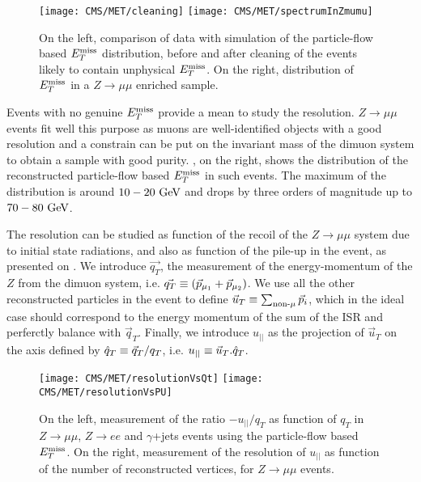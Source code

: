         \begin{figure}[h!]
            \centering
            \texttt{[image: CMS/MET/cleaning]}
            \texttt{[image: CMS/MET/spectrumInZmumu]}
            \caption{On the left, comparison \cite{METperf} of data with simulation of the
            particle-flow based $E_T^\text{miss}$ distribution, before and after cleaning of the events
            likely to contain unphysical $E_T^\text{miss}$. On the right, distribution of $E_T^\text{miss}$ in
            a $Z \rightarrow \mu\mu$ enriched sample. }
            \label{fig:METspectrum}
        \end{figure}

        Events with no genuine $E_T^\text{miss}$ provide a mean to study the resolution.
        $Z \rightarrow \mu\mu$ events fit well this purpose as muons are well-identified objects
        with a good resolution and a constrain can be put on the invariant mass of the
        dimuon system to obtain a sample with good purity. ,
        on the right, shows the distribution of the reconstructed particle-flow based
        $E_T^\text{miss}$ in such events. The maximum of the distribution is around $10-20~\text{GeV}$ and
        drops by three orders of magnitude up to $70-80~\text{GeV}$.

        The resolution can be studied as function of the recoil of the $Z \rightarrow \mu\mu$
        system due to initial state radiations, and also as function of the pile-up in the
        event, as presented on . We introduce $\vec{q_T}$,
        the measurement of the energy-momentum of the $Z$ from the dimuon system, i.e.
        $\vec{q_T} \equiv (\vec{p}_{\mu_1} + \vec{p}_{\mu_2})$. We use all the other
        reconstructed particles in the event to define $\vec{u}_T \equiv \sum_{\text{non-}\mu} \vec{p}_i$,
        which in the ideal case should correspond to the energy momentum of the sum of the
        ISR and perferctly balance with $\vec{q}_T$. Finally, we introduce $u_{||}$ as the
        projection of $\vec{u}_T$ on the axis defined by $\hat{q}_T \equiv \vec{q}_T
        / q_T$, i.e. $u_{||} \equiv \vec{u}_T . \hat{q}_T$.

        \begin{figure}[h!]
            \centering
            \texttt{[image: CMS/MET/resolutionVsQt]}
            \texttt{[image: CMS/MET/resolutionVsPU]}
            \caption{On the left, measurement of the ratio $-u_{||}/q_T$ as function of $q_T$
            in $Z\rightarrow\mu\mu$, $Z\rightarrow e e$ and $\gamma$+jets events using
            the particle-flow based $E_T^\text{miss}$. On the right, measurement of the resolution of
            $u_{||}$ as function of the number of reconstructed vertices, for
            $Z\rightarrow\mu\mu$ events.}
            \label{fig:METresolution}
        \end{figure}

